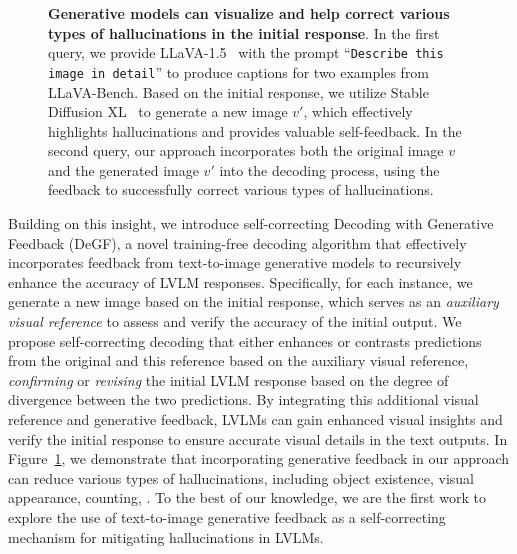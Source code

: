 \begin{figure}[t]
  \begin{center}
  \end{center}
  \vspace{-14pt}
  \caption{ 
  \textbf{Generative models can visualize and help correct various types of hallucinations in the initial response}.  In the first query, we provide LLaVA-1.5~\citep{liu2023visual} with the prompt ``\texttt{Describe this image in detail}'' to produce captions for two examples from LLaVA-Bench. Based on the initial response, we utilize Stable Diffusion XL~\citep{podell2024sdxl} to generate a new image $v'$, which effectively highlights hallucinations and provides valuable self-feedback.  In the second query, our approach incorporates both the original image $v$ and the generated image $v'$ into the decoding process, using the feedback to successfully correct various types of hallucinations.}
  \label{fig:intro}
   \vspace{-10pt}
\end{figure}


Building on this insight, we introduce self-correcting Decoding with Generative Feedback (DeGF), a novel training-free decoding algorithm that effectively incorporates feedback from text-to-image generative models to recursively enhance the accuracy of LVLM responses. 
Specifically, for each instance, we generate a new image based on the initial response, which serves as an \textit{auxiliary visual reference} to assess and verify the accuracy of the initial output.
We propose self-correcting decoding that either enhances or contrasts predictions from the original and this reference based on the auxiliary visual reference, \textit{confirming} or \textit{revising} the initial LVLM response based on the degree of divergence between the two predictions. By integrating this additional visual reference and generative feedback, LVLMs can gain enhanced visual insights and verify the initial response to ensure accurate visual details in the text outputs.
In Figure~\ref{fig:intro}, we demonstrate that incorporating generative feedback in our approach can reduce various types of hallucinations, including object existence, visual appearance, counting, \etc. To the best of our knowledge, we are the first work to explore the use of text-to-image generative feedback as a self-correcting mechanism for mitigating hallucinations in LVLMs.


